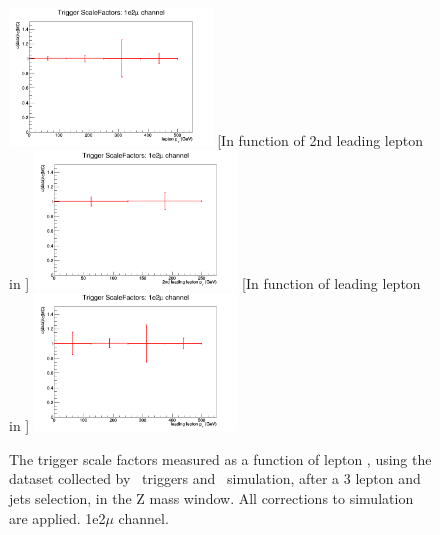 \begin{figure}[tb]
	[In function of lepton \pt]{
		\includegraphics[width=0.48\textwidth]{Appendix/Figures/trigger/ScaleFactors/1e2mu/SF_trigger_1e2muhistPt.png}
		\label{image:1e2muhistPt.png}
	}
	[In function of 2nd leading lepton in \pt]{
		\includegraphics[width=0.48\textwidth]{Appendix/Figures/trigger/ScaleFactors/1e2mu/SF_trigger_1e2muhistPt_2ndleadinglep.png}
		\label{image:1e2muhistPt_2ndleadinglep.png}
	}
	[In function of leading lepton in \pt]{
		\includegraphics[width=0.48\textwidth]{Appendix/Figures/trigger/ScaleFactors/1e2mu/SF_trigger_1e2muhistPt_leadinglep.png}
		\label{image:1e2muhistPt_leadinglep.png}
	}
	\caption{The trigger scale factors measured as a function of lepton \pt, using the dataset collected by \Etmis\ triggers and \WZ\ simulation, after a 3 lepton and jets selection, in the Z mass window. All corrections to simulation are applied. 1e2$\mu$ channel.}
	\label{image:FigurestriggerScaleFactors1e2mu}
\end{figure}

